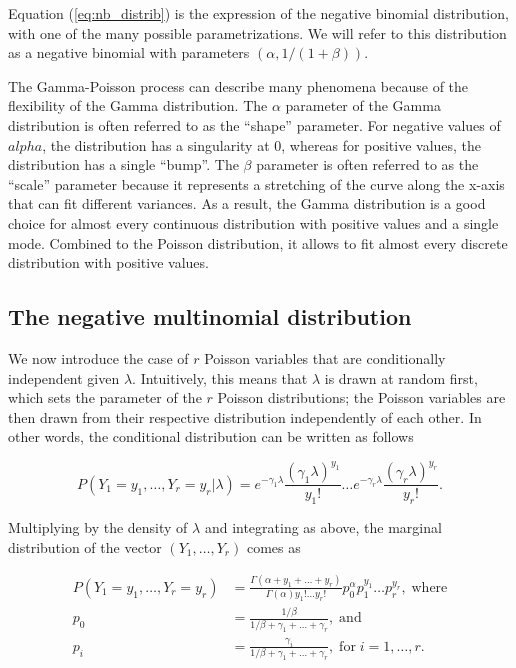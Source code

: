 \documentclass[12pt]{article}
\begin{document}
\begin{appendices}
    Equation (\ref{eq:nb_distrib}) is the expression of the negative
    binomial distribution, with one of the many possible
    parametrizations. We will refer to this distribution as a
    negative binomial with parameters $(\alpha, 1/(1+\beta))$.

    The Gamma-Poisson process can describe many phenomena
    because of the flexibility of the Gamma distribution. The
    $\alpha$ parameter of the Gamma distribution is often referred
    to as the ``shape'' parameter. For negative values of $alpha$,
    the distribution has a singularity at 0, whereas for positive
    values, the distribution has a single ``bump''. The $\beta$
    parameter is often referred to as the ``scale'' parameter
    because it represents a stretching of the curve along the x-axis
    that can fit different variances. As a result, the Gamma
    distribution is a good choice for almost every continuous
    distribution with positive values and a single mode. Combined
    to the Poisson distribution, it allows to fit almost every
    discrete distribution with positive values.

\subsection{The negative multinomial distribution}

    We now introduce the case of $r$ Poisson variables that are
    conditionally independent given $\lambda$. Intuitively, this
    means that $\lambda$ is drawn at random first, which sets the
    parameter of the $r$ Poisson distributions; the Poisson
    variables are then drawn from their respective distribution
    independently of each other. In other words, the conditional
    distribution can be written as follows

    \begin{equation}
\label{eq:conditional_nm}
      P(Y_1=y_1, \ldots, Y_r=y_r|\lambda) = 
      e^{-\gamma_1\lambda}\frac{(\gamma_1\lambda)^{y_1}}{y_1!}
      \ldots
      e^{-\gamma_r\lambda}\frac{(\gamma_r\lambda)^{y_r}}{y_r!}.
    \end{equation}

    Multiplying by the density of $\lambda$ and integrating as
    above, the marginal distribution of the vector
    $(Y_1, \ldots, Y_r)$ comes as

    \begin{align}
\label{eq:nm_distrib}
      P(Y_1=y_1, \ldots, Y_r=y_r) &=
      \frac{\Gamma(\alpha+y_1+\ldots+y_r)}
      {\Gamma(\alpha)y_1!\ldots y_r!}p_0^{\alpha}p_1^{y_1}
      \ldots p_r^{y_r}, \; \text{where}                \\
      p_0 &= \frac{1/\beta}{1/\beta+\gamma_1+\ldots+\gamma_r},
      \; \text{and} \nonumber \\
      p_i &= \frac{\gamma_i}{1/\beta+\gamma_1+\ldots+\gamma_r},
      \; \text{for} \; i = 1, \ldots, r. \nonumber
    \end{align}


\end{appendices}
\end{document}

